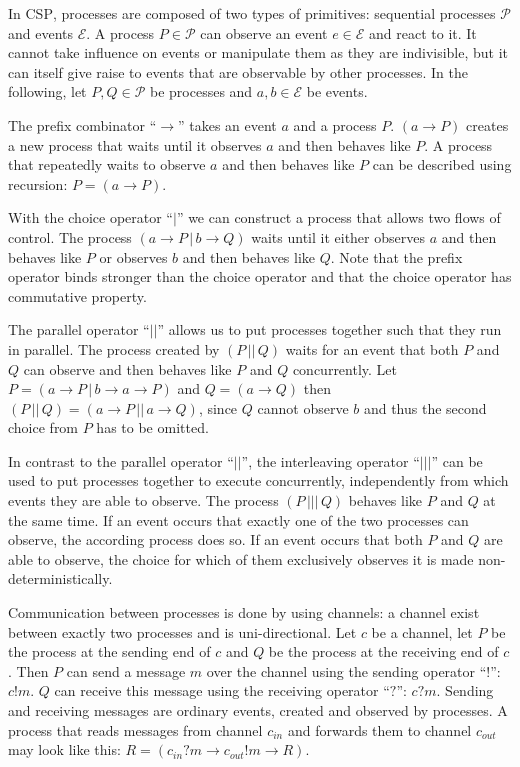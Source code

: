 In \textsc{CSP}, processes are composed of two types of primitives: sequential processes $\mathcal{P}$ and events $\mathcal{E}$. A process $P \in \mathcal{P}$ can observe an event $e \in \mathcal{E}$ and react to it. It cannot take influence on events or manipulate them as they are indivisible, but it can itself give raise to events that are observable by other processes. In the following, let $P, Q \in \mathcal{P}$ be processes and $a,b \in \mathcal{E}$ be events.

The prefix combinator \enquote{$\to$} takes an event $a$ and a process $P$. $\left( a \to P \right)$ creates a new process that waits until it observes $a$ and then behaves like $P$. A process that repeatedly waits to observe $a$ and then behaves like $P$ can be described using recursion: $P = \left( a \to P \right)$.

With the choice operator \enquote{$|$} we can construct a process that allows two flows of control. The process $\left( a \to P \,|\, b \to Q \right)$ waits until it either observes $a$ and then behaves like $P$ or observes $b$ and then behaves like $Q$. Note that the prefix operator binds stronger than the choice operator and that the choice operator has commutative property.

The parallel operator \enquote{$||$} allows us to put processes together such that they run in parallel. The process created by $\left( P \,||\, Q \right)$ waits for an event that both $P$ and $Q$ can observe and then behaves like $P$ and $Q$ concurrently. Let $P = \left( a \to P \,|\, b \to a \to P \right)$ and $Q = \left( a \to Q \right)$ then $\left( P \,||\, Q \right) = \left( a \to P \,||\, a \to Q \right)$, since $Q$ cannot observe $b$ and thus the second choice from $P$ has to be omitted.

In contrast to the parallel operator \enquote{$||$}, the interleaving operator \enquote{$|||$} can be used to put processes together to execute concurrently, independently from which events they are able to observe. The process $\left( P \,|||\, Q \right)$ behaves like $P$ and $Q$ at the same time. If an event occurs that exactly one of the two processes can observe, the according process does so. If an event occurs that both $P$ and $Q$ are able to observe, the choice for which of them exclusively observes it is made non-deterministically.

Communication between processes is done by using channels: a channel exist between exactly two processes and is uni-directional. Let $c$ be a channel, let $P$ be the process at the sending end of $c$ and $Q$ be the process at the receiving end of $c$. Then $P$ can send a message $m$ over the channel using the sending operator \enquote{$!$}: $c!m$. $Q$ can receive this message using the receiving operator \enquote{$?$}: $c?m$. Sending and receiving messages are ordinary events, created and observed by processes. A process that reads messages from channel $c_{in}$ and forwards them to channel $c_{out}$ may look like this: $R = \left( c_{in}?m \to c_{out}!m \to R \right)$.


